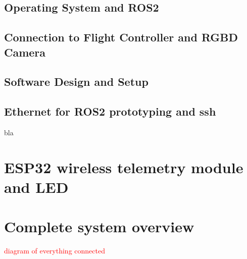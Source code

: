 \subsection{Operating System and ROS2}
\subsection{Connection to Flight Controller and RGBD Camera}
\subsection{Software Design and Setup}
\subsection{Ethernet for ROS2 prototyping and ssh}
bla
\section{ESP32 wireless telemetry module and LED}

\section{Complete system overview}
\textcolor{red}{diagram of everything connected}
